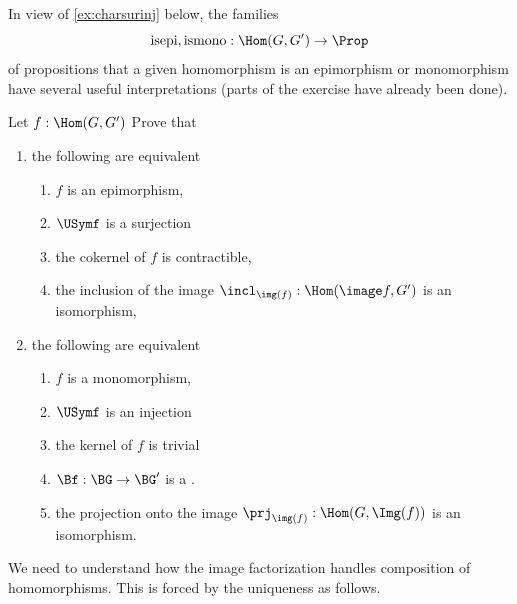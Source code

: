 In view of \cref{ex:charsurinj} below, the families
$$\mathrm{isepi},\mathrm{ismono}:\Hom(G,G')\to\Prop
$$
of propositions that a given homomorphism is an epimorphism or monomorphism have several useful interpretations (parts of the exercise have already been done).
\begin{xca}
  \label{ex:charsurinj}
  Let $f:\Hom(G,G')$ Prove that
  \begin{enumerate}
  \item the following are equivalent
    \begin{enumerate}
    \item $f$ is an epimorphism,
    \item $\USymf$ is a surjection
    \item the cokernel of $f$ is contractible,
    \item the inclusion of the image $\incl_{\img(f)}:\Hom(\image f,G')$ is an isomorphism,
    \end{enumerate}
  \item the following are equivalent
    \begin{enumerate}
    \item $f$ is a monomorphism,
    \item $\USymf$ is an injection
\item the kernel of $f$ is trivial
\item $\Bf:\BG\to \BG'$ is a \covering.
\item the projection onto the image $\prj_{\img(f)}:\Hom(G,\Img(f))$ is an isomorphism.
    \end{enumerate}
  \end{enumerate}
\end{xca}

We need to understand how the image factorization handles composition of homomorphisms.
This is forced by the uniqueness as follows.

